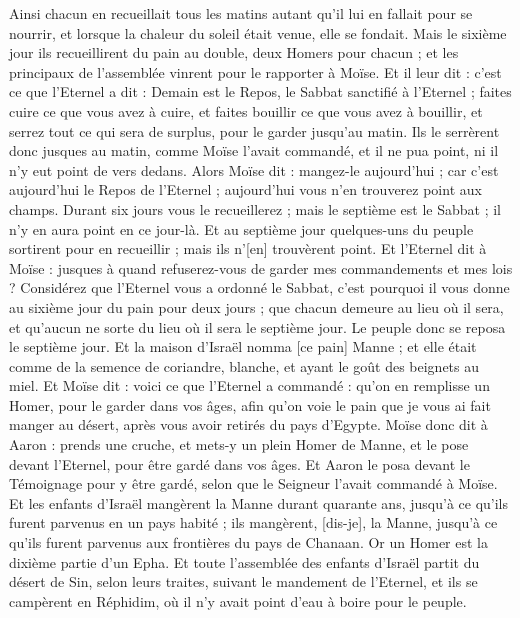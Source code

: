 \begin{multicols}{2}
Ainsi chacun en recueillait tous les matins autant qu'il lui en fallait pour se nourrir, et lorsque la chaleur du soleil était venue, elle se fondait.
Mais le sixième jour ils recueillirent du pain au double, deux Homers pour chacun ; et les principaux de l'assemblée vinrent pour le rapporter à Moïse.
Et il leur dit : c'est ce que l'Eternel a dit : Demain est le Repos, le Sabbat sanctifié à l'Eternel ; faites cuire ce que vous avez à cuire, et faites bouillir ce que vous avez à bouillir, et serrez tout ce qui sera de surplus, pour le garder jusqu'au matin.
Ils le serrèrent donc jusques au matin, comme Moïse l'avait commandé, et il ne pua point, ni il n'y eut point de vers dedans.
Alors Moïse dit : mangez-le aujourd'hui ; car c'est aujourd'hui le Repos de l'Eternel ; aujourd'hui vous n'en trouverez point aux champs.
Durant six jours vous le recueillerez ; mais le septième est le Sabbat ; il n'y en aura point en ce jour-là.
Et au septième jour quelques-uns du peuple sortirent pour en recueillir ; mais ils n'[en] trouvèrent point.
Et l'Eternel dit à Moïse : jusques à quand refuserez-vous de garder mes commandements et mes lois ?
Considérez que l'Eternel vous a ordonné le Sabbat, c'est pourquoi il vous donne au sixième jour du pain pour deux jours ; que chacun demeure au lieu où il sera, et qu'aucun ne sorte du lieu où il sera le septième jour.
Le peuple donc se reposa le septième jour.
Et la maison d'Israël nomma [ce pain] Manne ; et elle était comme de la semence de coriandre, blanche, et ayant le goût des beignets au miel.
Et Moïse dit : voici ce que l'Eternel a commandé : qu'on en remplisse un Homer, pour le garder dans vos âges, afin qu'on voie le pain que je vous ai fait manger au désert, après vous avoir retirés du pays d'Egypte.
Moïse donc dit à Aaron : prends une cruche, et mets-y un plein Homer de Manne, et le pose devant l'Eternel, pour être gardé dans vos âges.
Et Aaron le posa devant le Témoignage pour y être gardé, selon que le Seigneur l'avait commandé à Moïse.
Et les enfants d'Israël mangèrent la Manne durant quarante ans, jusqu'à ce qu'ils furent parvenus en un pays habité ; ils mangèrent, [dis-je], la Manne, jusqu'à ce qu'ils furent parvenus aux frontières du pays de Chanaan.
Or un Homer est la dixième partie d'un Epha.
\VerseOne{}Et toute l'assemblée des enfants d'Israël partit du désert de Sin, selon leurs traites, suivant le mandement de l'Eternel, et ils se campèrent en Réphidim, où il n'y avait point d'eau à boire pour le peuple.

\end{multicols}
